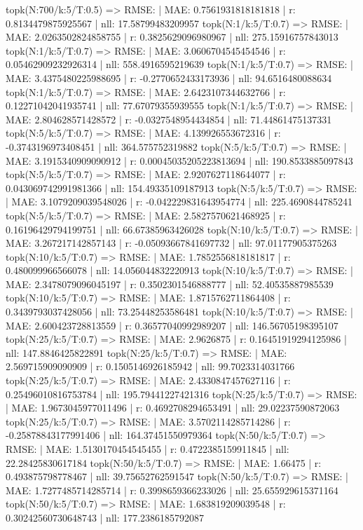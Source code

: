 topk(N:700/k:5/T:0.5) => RMSE: | MAE: 0.7561931818181818 | r: 0.8134479875925567 | nll: 17.58799483209957
topk(N:1/k:5/T:0.7) => RMSE: | MAE: 2.0263502824858755 | r: 0.3825629096980967 | nll: 275.15916757843013
topk(N:1/k:5/T:0.7) => RMSE: | MAE: 3.0606704545454546 | r: 0.05462909232926314 | nll: 558.4916595219639
topk(N:1/k:5/T:0.7) => RMSE: | MAE: 3.4375480225988695 | r: -0.2770652433173936 | nll: 94.6516480088634
topk(N:1/k:5/T:0.7) => RMSE: | MAE: 2.6423107344632766 | r: 0.12271042041935741 | nll: 77.67079355939555
topk(N:1/k:5/T:0.7) => RMSE: | MAE: 2.804628571428572 | r: -0.0327548954434854 | nll: 71.44861475137331
topk(N:5/k:5/T:0.7) => RMSE: | MAE: 4.139926553672316 | r: -0.3743196973408451 | nll: 364.575752319882
topk(N:5/k:5/T:0.7) => RMSE: | MAE: 3.1915340909090912 | r: 0.00045035205223813694 | nll: 190.8533885097843
topk(N:5/k:5/T:0.7) => RMSE: | MAE: 2.9207627118644077 | r: 0.043069742991981366 | nll: 154.49335109187913
topk(N:5/k:5/T:0.7) => RMSE: | MAE: 3.1079209039548026 | r: -0.042229831643954774 | nll: 225.4690844785241
topk(N:5/k:5/T:0.7) => RMSE: | MAE: 2.5827570621468925 | r: 0.16196429794199751 | nll: 66.67385963426028
topk(N:10/k:5/T:0.7) => RMSE: | MAE: 3.267217142857143 | r: -0.05093667841697732 | nll: 97.01177905375263
topk(N:10/k:5/T:0.7) => RMSE: | MAE: 1.7852556818181817 | r: 0.480099966566078 | nll: 14.056044832220913
topk(N:10/k:5/T:0.7) => RMSE: | MAE: 2.3478079096045197 | r: 0.3502301546888777 | nll: 52.40535887985539
topk(N:10/k:5/T:0.7) => RMSE: | MAE: 1.8715762711864408 | r: 0.3439793037428056 | nll: 73.25448253586481
topk(N:10/k:5/T:0.7) => RMSE: | MAE: 2.600423728813559 | r: 0.36577040992989207 | nll: 146.56705198395107
topk(N:25/k:5/T:0.7) => RMSE: | MAE: 2.9626875 | r: 0.16451919294125986 | nll: 147.8846425822891
topk(N:25/k:5/T:0.7) => RMSE: | MAE: 2.569715909090909 | r: 0.1505146926185942 | nll: 99.7023314031766
topk(N:25/k:5/T:0.7) => RMSE: | MAE: 2.4330847457627116 | r: 0.25496010816753784 | nll: 195.79441227421316
topk(N:25/k:5/T:0.7) => RMSE: | MAE: 1.9673045977011496 | r: 0.4692708294653491 | nll: 29.02237590872063
topk(N:25/k:5/T:0.7) => RMSE: | MAE: 3.5702114285714286 | r: -0.25878843177991406 | nll: 164.37451550979364
topk(N:50/k:5/T:0.7) => RMSE: | MAE: 1.5130170454545455 | r: 0.4722385159911845 | nll: 22.28425830617184
topk(N:50/k:5/T:0.7) => RMSE: | MAE: 1.66475 | r: 0.493875798778467 | nll: 39.75652762591547
topk(N:50/k:5/T:0.7) => RMSE: | MAE: 1.7277485714285714 | r: 0.3998659366233026 | nll: 25.655929615371164
topk(N:50/k:5/T:0.7) => RMSE: | MAE: 1.683819209039548 | r: 0.30242560730648743 | nll: 177.2386185792087
